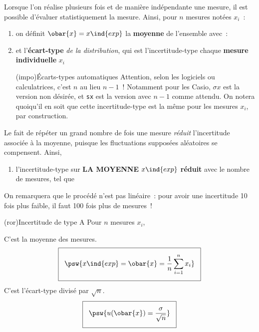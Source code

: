 \documentclass[../../main/main.tex]{subfiles}
\begin{document}
Lorsque l'on réalise plusieurs fois et de manière indépendante une mesure, il
est possible d'évaluer statistiquement la mesure. Ainsi, pour $n$ mesures notées
$x_i$~:
\begin{enumerate}
	\item on définit $\obar{x} = x\ind{exp}$ la \textbf{moyenne} de l'ensemble
	      avec~:
	      \psw{%
		      \[
			      \obar{x} = x\ind{exp} = \frac{1}{n} \sum_{i=1}^{n} x_i
		      \]
	      }%
	\item et l'\textbf{écart-type} \textit{de la distribution}, qui est
	      l'incertitude-type chaque \textbf{mesure individuelle} $x_i$
	      \psw{%
		      \[
			      u(x_i) = \sigma =
			      \sqrt{\frac{1}{n-1} \sum_{i=1}^{n} (x_i - \obar{x})^{2}}
		      \]
	      }%
	      \begin{tcb}(impo){Écarts-types automatiques}
		      Attention, selon les logiciels ou calculatrices, c'est $n$ au lieu
		      $n-1$~! Notamment pour les Casio, \texttt{$\sigma x$} est la version
		      non désirée, et \texttt{sx} est la version avec $n-1$ comme attendu.
		      On notera quoiqu'il en soit que cette incertitude-type est la même
		      pour  les mesures $x_i$, par construction.
	      \end{tcb}
\end{enumerate}
Le fait de répéter un grand nombre de fois une mesure \textit{réduit}
l'incertitude associée à la moyenne, puisque les fluctuations supposées
aléatoires se compensent. Ainsi,
\begin{enumerate}[resume]
	\item l'incertitude-type sur \textbf{LA MOYENNE} $x\ind{exp}$ \textbf{réduit}
	      avec le nombre de mesures, tel que
	      \psw{%
		      \[
			      u(\obar{x}) = \frac{u(x_i)}{\sqrt{n}} = \frac{\sigma}{\sqrt{n}}
		      \]
	      }%
\end{enumerate}

On remarquera que le procédé n'est pas linéaire~: pour avoir une incertitude 10
fois plus faible, il faut 100 fois plus de mesures~!

\begin{tcb*}(ror){Incertitude de type A}
	Pour $n$ mesures $x_i$,
	\smallbreak
	\begin{isd}[cnt]
		C'est la moyenne des mesures.
		\[
			\setlength{\fboxsep}{3mm}
			\boxed{%
				\psw{%
					x\ind{exp} = \obar{x} = \frac{1}{n} \sum_{i=1}^{n} x_i
				}%
			}
		\]
		\tcblower
		C'est l'écart-type divisé par $\sqrt{n}$.
		\[
			\setlength{\fboxsep}{3mm}
			\boxed{%
				\psw{%
					u(\obar{x}) = \frac{\sigma}{\sqrt{n}}
				}%
			}
		\]
	\end{isd}
\end{tcb*}
\end{document}

